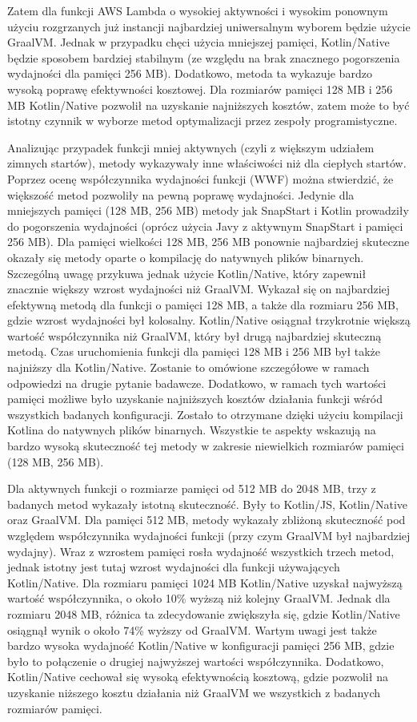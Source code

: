 Zatem dla funkcji AWS Lambda o wysokiej aktywności i wysokim ponownym użyciu rozgrzanych już instancji najbardziej uniwersalnym wyborem będzie użycie GraalVM.
Jednak w przypadku chęci użycia mniejszej pamięci, Kotlin/Native będzie sposobem bardziej stabilnym (ze względu na brak znacznego pogorszenia wydajności dla pamięci 256 MB).
Dodatkowo, metoda ta wykazuje bardzo wysoką poprawę efektywności kosztowej.
Dla rozmiarów pamięci 128 MB i 256 MB Kotlin/Native pozwolił na uzyskanie najniższych kosztów, zatem może to być istotny czynnik w wyborze metod optymalizacji przez zespoły programistyczne.

Analizując przypadek funkcji mniej aktywnych (czyli z większym udziałem zimnych startów), metody wykazywały inne właściwości niż dla ciepłych startów.
Poprzez ocenę współczynnika wydajności funkcji (WWF) można stwierdzić, że większość metod pozwoliły na pewną poprawę wydajności.
Jedynie dla mniejszych pamięci (128 MB, 256 MB) metody jak SnapStart i Kotlin prowadziły do pogorszenia wydajności (oprócz użycia Javy z aktywnym SnapStart i pamięci 256 MB).
Dla pamięci wielkości 128 MB, 256 MB ponownie najbardziej skuteczne okazały się metody oparte o kompilację do natywnych plików binarnych.
Szczególną uwagę przykuwa jednak użycie Kotlin/Native, który zapewnił znacznie większy wzrost wydajności niż GraalVM.
Wykazał się on najbardziej efektywną metodą dla funkcji o pamięci 128 MB, a także dla rozmiaru 256 MB, gdzie wzrost wydajności był kolosalny.
Kotlin/Native osiągnał trzykrotnie większą wartość współczynnika niż GraalVM, który był drugą najbardziej skuteczną metodą.
Czas uruchomienia funkcji dla pamięci 128 MB i 256 MB był także najniższy dla Kotlin/Native.
Zostanie to omówione szczegółowe w ramach odpowiedzi na drugie pytanie badawcze.
Dodatkowo, w ramach tych wartości pamięci możliwe było uzyskanie najniższych kosztów działania funkcji wśród wszystkich badanych konfiguracji.
Zostało to otrzymane dzięki użyciu kompilacji Kotlina do natywnych plików binarnych.
Wszystkie te aspekty wskazują na bardzo wysoką skuteczność tej metody w zakresie niewielkich rozmiarów pamięci (128 MB, 256 MB).

Dla aktywnych funkcji o rozmiarze pamięci od 512 MB do 2048 MB, trzy z badanych metod wykazały istotną skuteczność.
Były to Kotlin/JS, Kotlin/Native oraz GraalVM.
Dla pamięci 512 MB, metody wykazały zbliżoną skuteczność pod względem współczynnika wydajności funkcji (przy czym GraalVM był najbardziej wydajny).
Wraz z wzrostem pamięci rosła wydajność wszystkich trzech metod, jednak istotny jest tutaj wzrost wydajności dla funkcji używających Kotlin/Native.
Dla rozmiaru pamięci 1024 MB Kotlin/Native uzyskał najwyższą wartość współczynnika, o około 10\% wyższą niż kolejny GraalVM.
Jednak dla rozmiaru 2048 MB, różnica ta zdecydowanie zwiększyła się, gdzie Kotlin/Native osiągnął wynik o około 74\% wyższy od GraalVM.
Wartym uwagi jest także bardzo wysoka wydajność Kotlin/Native w konfiguracji pamięci 256 MB, gdzie było to połączenie o drugiej najwyższej wartości współczynnika.
Dodatkowo, Kotlin/Native cechował się wysoką efektywnością kosztową, gdzie pozwolił na uzyskanie niższego kosztu działania niż GraalVM we wszystkich z badanych rozmiarów pamięci.

